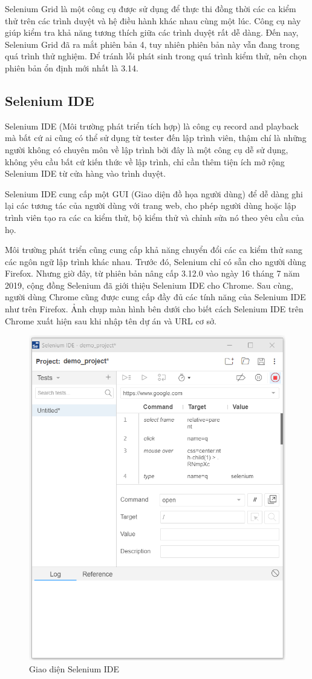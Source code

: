 \documentclass[./../main_file.tex]{subfiles}
\begin{document}
	Selenium Grid là một công cụ được sử dụng để thực thi đồng thời các ca kiểm thử trên các trình duyệt và hệ điều hành khác nhau cùng một lúc. Công cụ này giúp kiểm tra khả năng tương thích giữa các trình duyệt rất dễ dàng. Đến nay, Selenium Grid đã ra mắt phiên bản 4, tuy nhiên phiên bản này vẫn đang trong quá trình thử nghiệm. Để tránh lỗi phát sinh trong quá trình kiểm thử, nên chọn phiên bản ổn định mới nhất là 3.14.
	
	\subsection{Selenium IDE}
	
	Selenium IDE (Môi trường phát triển tích hợp) là công cụ record and playback mà bất cứ ai cũng có thể sử dụng từ tester đến lập trình viên, thậm chí là những người không có chuyên môn về lập trình bởi đây là một công cụ dễ sử dụng, không yêu cầu bất cứ kiến thức về lập trình, chỉ cần thêm tiện ích mở rộng Selenium IDE từ cửa hàng vào trình duyệt.
	
	Selenium IDE cung cấp một GUI (Giao diện đồ họa người dùng) để dễ dàng ghi lại các tương tác của người dùng với trang web, cho phép người dùng hoặc lập trình viên tạo ra các ca kiểm thử, bộ kiểm thử và chỉnh sửa nó theo yêu cầu của họ.
	
	Môi trường phát triển cũng cung cấp khả năng chuyển đổi các ca kiểm thử sang các ngôn ngữ lập trình khác nhau. Trước đó, Selenium chỉ có sẵn cho người dùng Firefox. Nhưng giờ đây, từ phiên bản nâng cấp 3.12.0 vào ngày 16 tháng 7 năm 2019, cộng đồng Selenium đã giới thiệu Selenium IDE cho Chrome. Sau cùng, người dùng Chrome cũng được cung cấp đầy đủ các tính năng của Selenium IDE như trên Firefox. Ảnh chụp màn hình bên dưới cho biết cách Selenium IDE trên Chrome xuất hiện sau khi nhập tên dự án và URL cơ sở.
	
	\begin{figure}[H]
		\centering
		\includegraphics[width=0.7\linewidth]{./images/image10.png}
		\caption{Giao diện Selenium IDE}
	\end{figure}
\end{document}
